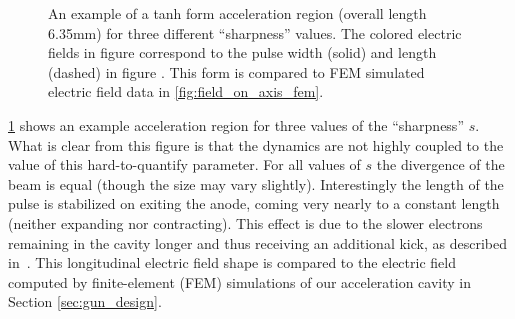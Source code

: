 \begin{figure}
  \centerline{
    \subfloat[][]{
      \label{fig:field_on_axis}
      \begin{tikzpicture}
        
      \end{tikzpicture}
    }
    \subfloat[][]{
      \label{fig:tanh_sharpness}
      
    }
  }
  \caption[An example of a tanh form acceleration region for three different ``sharpness'' values]{
    An example of a tanh form acceleration region (overall length 6.35mm) for three different ``sharpness'' values.
    The colored electric fields in figure \protect{} correspond to the pulse width (solid) and length (dashed) in figure \protect{}.
    This form is compared to FEM simulated electric field data in \ref{fig:field_on_axis_fem}.
  }
  \label{fig:gun-sharpness}
\end{figure}

\ref{fig:gun-sharpness} shows an example acceleration region for three values of the ``sharpness'' $s$.
What is clear from this figure is that the dynamics are not highly coupled to the value of this hard-to-quantify parameter.
For all values of $s$ the divergence of the beam is equal (though the size may vary slightly).
Interestingly the length of the pulse is stabilized on exiting the anode, coming very nearly to a constant length (neither expanding nor contracting).
This effect is due to the slower electrons remaining in the cavity longer and thus receiving an additional kick, as described in~\cite{oudheusden_electron_2007}.
This longitudinal electric field shape is compared to the electric field computed by finite-element (FEM) simulations of our acceleration cavity in Section \ref{sec:gun_design}.


